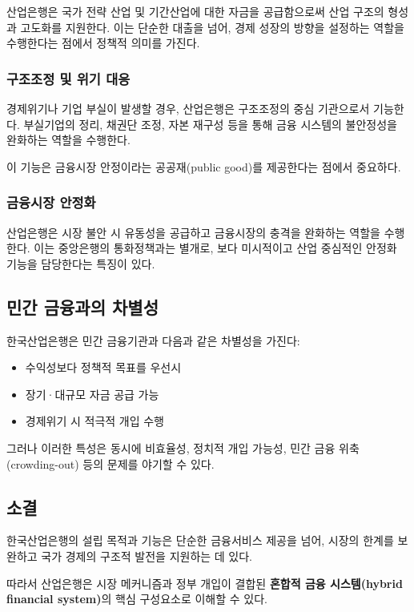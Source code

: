 산업은행은 국가 전략 산업 및 기간산업에 대한 자금을 공급함으로써 산업 구조의 형성과 고도화를 지원한다.  
이는 단순한 대출을 넘어, 경제 성장의 방향을 설정하는 역할을 수행한다는 점에서 정책적 의미를 가진다.

\subsubsection{구조조정 및 위기 대응}

경제위기나 기업 부실이 발생할 경우, 산업은행은 구조조정의 중심 기관으로서 기능한다.  
부실기업의 정리, 채권단 조정, 자본 재구성 등을 통해 금융 시스템의 불안정성을 완화하는 역할을 수행한다.

이 기능은 금융시장 안정이라는 공공재(public good)를 제공한다는 점에서 중요하다.

\subsubsection{금융시장 안정화}

산업은행은 시장 불안 시 유동성을 공급하고 금융시장의 충격을 완화하는 역할을 수행한다.  
이는 중앙은행의 통화정책과는 별개로, 보다 미시적이고 산업 중심적인 안정화 기능을 담당한다는 특징이 있다.

\subsection{민간 금융과의 차별성}

한국산업은행은 민간 금융기관과 다음과 같은 차별성을 가진다:

\begin{itemize}
    \item 수익성보다 정책적 목표를 우선시
    \item 장기·대규모 자금 공급 가능
    \item 경제위기 시 적극적 개입 수행
\end{itemize}

그러나 이러한 특성은 동시에 비효율성, 정치적 개입 가능성, 민간 금융 위축(crowding-out) 등의 문제를 야기할 수 있다.

\subsection{소결}

한국산업은행의 설립 목적과 기능은 단순한 금융서비스 제공을 넘어, 시장의 한계를 보완하고 국가 경제의 구조적 발전을 지원하는 데 있다.

따라서 산업은행은 시장 메커니즘과 정부 개입이 결합된 \textbf{혼합적 금융 시스템(hybrid financial system)}의 핵심 구성요소로 이해할 수 있다.